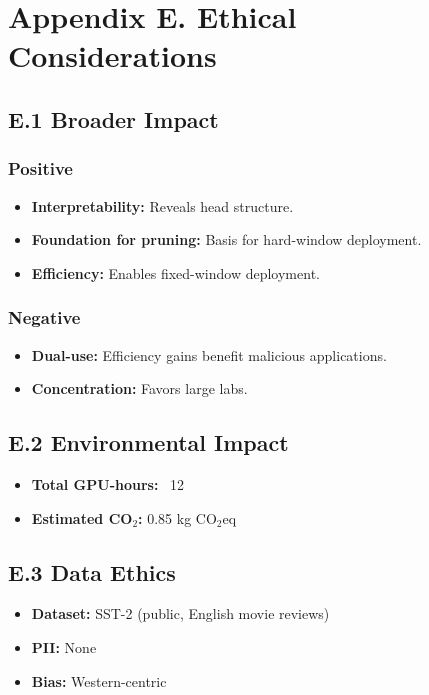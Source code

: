 
\section{Appendix E. Ethical Considerations}

\subsection{E.1 Broader Impact}

\subsubsection{Positive}
\begin{itemize}
\item \textbf{Interpretability:} Reveals head structure.
\item \textbf{Foundation for pruning:} Basis for hard-window deployment.
\item \textbf{Efficiency:} Enables fixed-window deployment.

\end{itemize}
\subsubsection{Negative}
\begin{itemize}
\item \textbf{Dual-use:} Efficiency gains benefit malicious applications.
\item \textbf{Concentration:} Favors large labs.

\end{itemize}
\subsection{E.2 Environmental Impact}

\begin{itemize}
\item \textbf{Total GPU-hours:} ~12
\item \textbf{Estimated CO$_2$:} 0.85 kg CO$_2$eq

\end{itemize}
\subsection{E.3 Data Ethics}

\begin{itemize}
\item \textbf{Dataset:} SST-2 (public, English movie reviews)
\item \textbf{PII:} None
\item \textbf{Bias:} Western-centric

\end{itemize}
